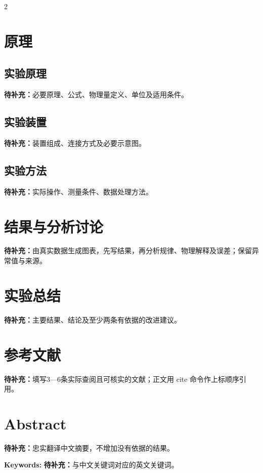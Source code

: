 \documentclass[UTF8,a4paper,11pt,fontset=fandol,scheme=plain]{ctexart}
\newcommand{\ReportTODO}[1]{\textbf{待补充：}#1}
\begin{document}
\begin{multicols}{2}\raggedcolumns
\section{原理}\label{sec:principle}
\subsection{实验原理}
\ReportTODO{必要原理、公式、物理量定义、单位及适用条件。}
\subsection{实验装置}
\ReportTODO{装置组成、连接方式及必要示意图。}
\subsection{实验方法}
\ReportTODO{实际操作、测量条件、数据处理方法。}

\section{结果与分析讨论}\label{sec:results}
\ReportTODO{由真实数据生成图表，先写结果，再分析规律、物理解释及误差；保留异常值与来源。}

\section{实验总结}\label{sec:conclusion}
\ReportTODO{主要结果、结论及至少两条有依据的改进建议。}

\section{参考文献}
\ReportTODO{填写3—6条实际查阅且可核实的文献；正文用 cite 命令作上标顺序引用。}

\end{multicols}

\par\bigskip\noindent\begin{minipage}{\linewidth}
\section*{Abstract}
\ReportTODO{忠实翻译中文摘要，不增加没有依据的结果。}
\par\noindent\textbf{Keywords: }\ReportTODO{与中文关键词对应的英文关键词。}
\end{minipage}\par

\end{document}

